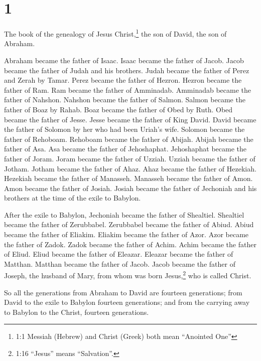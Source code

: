 \hypertarget{section}{%
\section{1}\label{section}}

 The book of the genealogy of Jesus Christ,\footnote{1:1
  Messiah (Hebrew) and Christ (Greek) both mean ``Anointed One''} the
son of David, the son of Abraham.

 Abraham became the father of Isaac. Isaac became the father
of Jacob. Jacob became the father of Judah and his brothers.
 Judah became the father of Perez and Zerah by Tamar. Perez
became the father of Hezron. Hezron became the father of Ram.
 Ram became the father of Amminadab. Amminadab became the
father of Nahshon. Nahshon became the father of Salmon. 
Salmon became the father of Boaz by Rahab. Boaz became the father of
Obed by Ruth. Obed became the father of Jesse.  Jesse became
the father of King David. David became the father of Solomon by her who
had been Uriah's wife.  Solomon became the father of
Rehoboam. Rehoboam became the father of Abijah. Abijah became the father
of Asa.  Asa became the father of Jehoshaphat. Jehoshaphat
became the father of Joram. Joram became the father of Uzziah.
 Uzziah became the father of Jotham. Jotham became the
father of Ahaz. Ahaz became the father of Hezekiah. 
Hezekiah became the father of Manasseh. Manasseh became the father of
Amon. Amon became the father of Josiah.  Josiah became the
father of Jechoniah and his brothers at the time of the exile to
Babylon.

 After the exile to Babylon, Jechoniah became the father of
Shealtiel. Shealtiel became the father of Zerubbabel. 
Zerubbabel became the father of Abiud. Abiud became the father of
Eliakim. Eliakim became the father of Azor.  Azor became
the father of Zadok. Zadok became the father of Achim. Achim became the
father of Eliud.  Eliud became the father of Eleazar.
Eleazar became the father of Matthan. Matthan became the father of
Jacob.  Jacob became the father of Joseph, the husband of
Mary, from whom was born Jesus,\footnote{1:16 ``Jesus'' means
  ``Salvation''.} who is called Christ.

 So all the generations from Abraham to David are fourteen
generations; from David to the exile to Babylon fourteen generations;
and from the carrying away to Babylon to the Christ, fourteen
generations.

